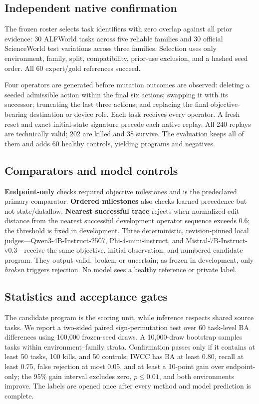 \documentclass[10pt]{article}
\begin{document}
\subsection{Independent native confirmation}
The frozen roster selects \TaskCount{} task identifiers with zero overlap against all prior evidence: 30 ALFWorld tasks across five reliable families and 30 official ScienceWorld test variations across three families. Selection uses only environment, family, split, compatibility, prior-use exclusion, and a hashed seed order. All 60 expert/gold references succeed.

Four operators are generated before mutation outcomes are observed: deleting a seeded admissible action within the final six actions; swapping it with its successor; truncating the last three actions; and replacing the final objective-bearing destination or device role. Each task receives every operator. A fresh reset and exact initial-state signature precede each native replay. All 240 replays are technically valid; 202 are killed and 38 survive. The evaluation keeps all of them and adds 60 healthy controls, yielding \CandidateCount{} programs and \ControlCount{} negatives.

\subsection{Comparators and model controls}
\textbf{Endpoint-only} checks required objective milestones and is the predeclared primary comparator. \textbf{Ordered milestones} also checks learned precedence but not state/dataflow. \textbf{Nearest successful trace} rejects when normalized edit distance from the nearest successful development operator sequence exceeds 0.6; the threshold is fixed in development. Three deterministic, revision-pinned local judges---Qwen3-4B-Instruct-2507, Phi-4-mini-instruct, and Mistral-7B-Instruct-v0.3---receive the same objective, initial observation, and numbered candidate program. They output valid, broken, or uncertain; as frozen in development, only \emph{broken} triggers rejection. No model sees a healthy reference or private label.

\subsection{Statistics and acceptance gates}
The candidate program is the scoring unit, while inference respects shared source tasks. We report a two-sided paired sign-permutation test over 60 task-level BA differences using 100,000 frozen-seed draws. A 10,000-draw bootstrap samples tasks within environment--family strata. Confirmation passes only if it contains at least 50 tasks, 100 kills, and 50 controls; IWCC has BA at least 0.80, recall at least 0.75, false rejection at most 0.05, and at least a 10-point gain over endpoint-only; the 95\% gain interval excludes zero, $p\le0.01$, and both environments improve. The labels are opened once after every method and model prediction is complete.
\end{document}
